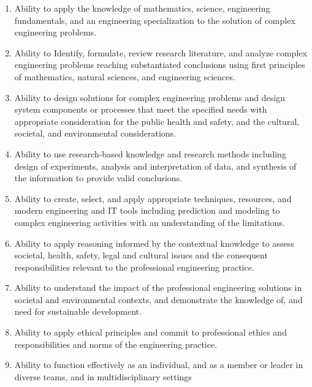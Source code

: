 \begin{spacing}{1.1}

\begin{enumerate}


\item Ability to apply the knowledge of mathematics, science, engineering fundamentals, and an engineering specialization to the solution of complex engineering problems.

\item Ability to Identify, formulate, review research literature, and analyze complex engineering problems reaching substantiated conclusions using first principles of mathematics, natural sciences, and engineering sciences.

\item Ability to design solutions for complex engineering problems and design system components or processes that meet the specified needs with appropriate consideration for the public health and safety, and the cultural, societal, and environmental considerations.

\item Ability to use research-based knowledge and research methods including design of experiments, analysis and interpretation of data, and synthesis of the information to provide valid conclusions.

\item Ability to create, select, and apply appropriate techniques, resources, and modern engineering and IT tools including prediction and modeling to complex engineering activities with an understanding of the limitations.

\item Ability to apply reasoning informed by the contextual knowledge to assess societal, health, safety, legal and cultural issues and the consequent responsibilities relevant to the professional engineering practice.

\item Ability to understand the impact of the professional engineering solutions in societal and environmental contexts, and demonstrate the knowledge of, and need for sustainable development.

\item Ability to apply ethical principles and commit to professional ethics and responsibilities and norms of the engineering practice.

\item Ability to function effectively as an individual, and as a member or leader in diverse teams, and in multidisciplinary settings


\end{enumerate}
\end{spacing}
